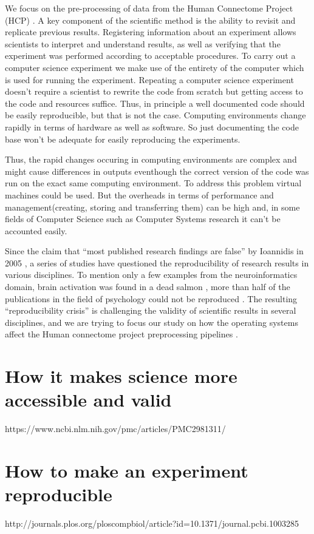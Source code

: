 We focus on the pre-processing of data from the Human Connectome Project (HCP) \cite{Gla13}.
A key component of the scientific method is the ability to revisit and replicate previous results. Registering information about an experiment allows scientists to interpret and
understand results, as well as verifying that the experiment was performed according to acceptable procedures. To carry out a computer science experiment we make use of the entirety of the computer which is used for running the experiment. Repeating a computer science experiment doesn't require a scientist to rewrite the code from scratch but getting access to the code and resources suffice. Thus, in principle a well documented code should be easily reproducible, but that is not the case. Computing environments change rapidly in terms of hardware as well as software. So just documenting the code base won't be adequate for easily reproducing the experiments.

Thus, the rapid changes occuring in computing environments are complex and might cause differences in outputs eventhough the correct version of the code was run on the exact same computing environment. To address this problem virtual machines could be used. But the overheads in terms of performance and management(creating, storing and transferring them) can be high and, in some fields of Computer Science such as Computer Systems research it can't be accounted easily. \cite{7092948}

Since the claim that ``most published research findings are false” by Ioannidis in 2005 \cite{10.1371/journal.pmed.0020124}, a series of studies have questioned the reproducibility of research results in various disciplines. To mention only a few examples from the neuroinformatics domain, brain activation was found in a dead salmon \cite{BENNETT2009S125}, more than half of the publications in the field of psychology could not be reproduced \cite{aac4716}. The resulting “reproducibility crisis” is challenging the validity of scientific results in several disciplines, and we are trying to focus our study on how the operating systems affect the Human connectome project preprocessing pipelines \cite{Gla13}.

\section{How it makes science more accessible and valid}
https://www.ncbi.nlm.nih.gov/pmc/articles/PMC2981311/
\section{How to make an experiment reproducible}
http://journals.plos.org/ploscompbiol/article?id=10.1371/journal.pcbi.1003285

